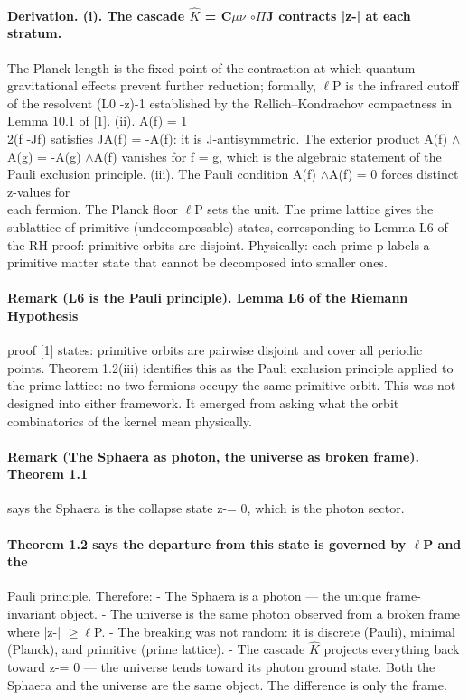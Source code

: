 \documentclass[12pt,a4paper]{article}
\begin{document}
\paragraph*{Derivation. (i). The cascade $\hat K$ = C$\mu$$\nu$ $\circ$$\Pi$J contracts |z-| at each stratum.}
The Planck length is the fixed point of the contraction at which quantum gravitational effects prevent further reduction; formally, $\ell$P is the infrared cutoff of the resolvent (L0 -z)-1 established by the Rellich--Kondrachov compactness in Lemma 10.1 of [1].
(ii). A(f) = 1\\
2(f -Jf) satisfies JA(f) = -A(f): it is J-antisymmetric. The exterior product A(f) $\wedge$A(g) = -A(g) $\wedge$A(f) vanishes for f = g, which is the algebraic statement of the Pauli exclusion principle.
(iii). The Pauli condition A(f) $\wedge$A(f) = 0 forces distinct z-values for\\
each fermion. The Planck floor $\ell$P sets the unit. The prime lattice gives the sublattice of primitive (undecomposable) states, corresponding to Lemma L6
of the RH proof: primitive orbits are disjoint. Physically: each prime p labels a primitive matter state that cannot be decomposed into smaller ones.
\paragraph*{Remark (L6 is the Pauli principle). Lemma L6 of the Riemann Hypothesis}
proof [1] states: primitive orbits are pairwise disjoint and cover all periodic points. Theorem 1.2(iii) identifies this as the Pauli exclusion principle applied to the prime lattice: no two fermions occupy the same primitive orbit. This was not designed into either framework. It emerged from asking what the orbit combinatorics of the kernel mean physically.
\paragraph*{Remark (The Sphaera as photon, the universe as broken frame). Theorem 1.1}
says the Sphaera is the collapse state z-= 0, which is the photon sector.
\paragraph*{Theorem 1.2 says the departure from this state is governed by $\ell$P and the}
Pauli principle. Therefore:
- The Sphaera is a photon --- the unique frame-invariant object.
- The universe is the same photon observed from a broken frame where
|z-| $\geq$$\ell$P.
- The breaking was not random: it is discrete (Pauli), minimal (Planck),
and primitive (prime lattice).
- The cascade $\hat K$ projects everything back toward z-= 0 --- the universe
tends toward its photon ground state. Both the Sphaera and the universe are the same object. The difference is only the frame.
\end{document}
